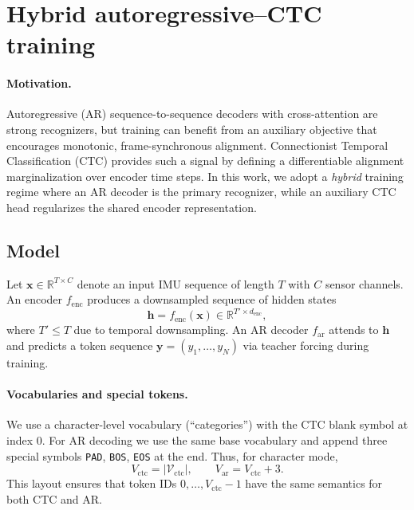 
\section{Hybrid autoregressive--CTC training}
\label{sec:hybrid-ar-ctc}

\paragraph{Motivation.}
Autoregressive (AR) sequence-to-sequence decoders with cross-attention are strong recognizers, but training can benefit from an auxiliary objective that encourages monotonic, frame-synchronous alignment.
Connectionist Temporal Classification (CTC) provides such a signal by defining a differentiable alignment marginalization over encoder time steps.
In this work, we adopt a \emph{hybrid} training regime where an AR decoder is the primary recognizer, while an auxiliary CTC head regularizes the shared encoder representation.

\subsection{Model}
Let $\mathbf{x} \in \mathbb{R}^{T \times C}$ denote an input IMU sequence of length $T$ with $C$ sensor channels.
An encoder $f_{\text{enc}}$ produces a downsampled sequence of hidden states
\begin{equation}
\mathbf{h} = f_{\text{enc}}(\mathbf{x}) \in \mathbb{R}^{T' \times d_{\text{enc}}},
\end{equation}
where $T' \le T$ due to temporal downsampling.
An AR decoder $f_{\text{ar}}$ attends to $\mathbf{h}$ and predicts a token sequence $\mathbf{y} = (y_1,\dots,y_N)$ via teacher forcing during training.

\paragraph{Vocabularies and special tokens.}
We use a character-level vocabulary (``categories'') with the CTC blank symbol at index $0$.
For AR decoding we use the same base vocabulary and append three special symbols \texttt{PAD}, \texttt{BOS}, \texttt{EOS} at the end.
Thus, for character mode,
\begin{equation}
V_{\text{ctc}} = |\mathcal{V}_{\text{ctc}}|, \qquad
V_{\text{ar}} = V_{\text{ctc}} + 3.
\end{equation}
This layout ensures that token IDs $0,\dots,V_{\text{ctc}}-1$ have the same semantics for both CTC and AR.

